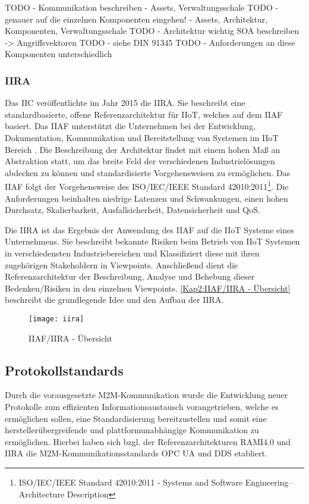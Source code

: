 TODO - Kommunikation beschreiben - Assets, Verwaltungsschale
TODO - genauer auf die einzelnen Komponenten eingehen! - Assets, Architektur, Komponenten, Verwaltungsschale
TODO - Architektur wichtig SOA beschreiben -> Angriffsvektoren
TODO - siehe DIN 91345
TODO - Anforderungen an diese Komponenten unterschiedlich

\subsubsection{IIRA}
Das \ac{IIC} veröffentlichte im Jahr 2015 die \ac{IIRA}. Sie beschreibt eine standardbasierte, offene Referenzarchitektur für \ac{IIoT}, welches auf dem \ac{IIAF} basiert. Das \ac{IIAF} unterstützt die Unternehmen bei der Entwicklung, Dokumentation, Kommunikation und Bereitstellung von Systemen im \ac{IIoT} Bereich \cite{iira2017}. Die Beschreibung der Architektur findet mit einem hohen Maß an Abstraktion statt, um das breite Feld der verschiedenen Industrielösungen abdecken zu können und standardisierte Vorgehensweisen zu ermöglichen. Das \ac{IIAF} folgt der Vorgehensweise des ISO/IEC/IEEE Standard 42010:2011\footnote{ISO/IEC/IEEE Standard 42010:2011 - Systems and Software Engineering–Architecture Description}. Die Anforderungen beinhalten niedrige Latenzen und Schwankungen, einen hohen Durchsatz, Skalierbarkeit, Ausfallsicherheit, Datensicherheit und \ac{QoS}.

Die \ac{IIRA} ist das Ergebnis der Anwendung des \ac{IIAF} auf die \ac{IIoT} Systeme eines Unternehmens. Sie beschreibt bekannte Risiken beim Betrieb von \ac{IIoT} Systemen in verschiedensten Industriebereichen und Klassifiziert diese mit ihren zugehörigen Stakeholdern in Viewpoints. Anschließend dient die Referenzarchitektur der Beschreibung, Analyse und Behebung dieser Bedenken/Risiken in den einzelnen Viewpoints. \autoref{Kap2:IIAF/IIRA - Übersicht} beschreibt die grundlegende Idee und den Aufbau der \ac{IIRA}.

\begin{figure}[h]
  \centering
  \texttt{[image: iira]}
  \caption{IIAF/IIRA - Übersicht} 
  \label{Kap2:IIAF/IIRA - Übersicht}
\end{figure}

\clearpage

\subsection{Protokollstandards}
Durch die vorausgesetzte M2M-Kommunikation wurde die Entwicklung neuer Protokolle zum effizienten Informationsaustausch vorangetrieben, welche es ermöglichen sollen, eine Standardisierung bereitzustellen und somit eine herstellerübergreifende und plattformunabhängige Kommunikation zu ermöglichen. Hierbei haben sich bzgl. der Referenzarchitekturen \ac{RAMI4.0} und \ac{IIRA} die \ac{M2M}-Kommunikationsstandards \ac{OPC UA} und \ac{DDS} etabliert.

